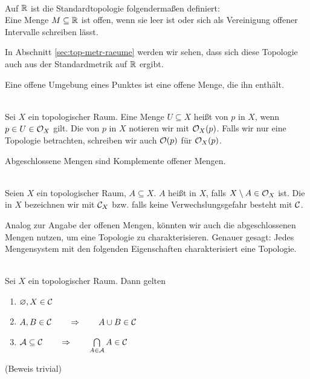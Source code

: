     \begin{bsp}\label{bsp:standard-r}\ \\
        Auf $\mathbb{R}$ ist die Standardtopologie folgendermaßen definiert:\\
        Eine Menge $M \subseteq \mathbb{R}$ ist offen, wenn sie leer ist oder sich als Vereinigung offener Intervalle schreiben lässt.
    \end{bsp}
    In Abschnitt \ref{sec:top-metr-raeume} werden wir sehen, dass sich diese Topologie auch aus der Standardmetrik auf $\mathbb{R}$ ergibt.

    Eine
    offene Umgebung eines Punktes ist eine offene Menge, die ihn enthält.
    \begin{dfn}\label{def:umg} \ \\
        Sei $X$ ein topologischer Raum. Eine Menge $U \subseteq X$ heißt  von $p$ in $X$, wenn $p \in U \in \mathcal{O}_X$ gilt. Die  von $p$ in $X$ notieren wir mit $\mathcal{O}_X(p)$. Falls wir nur eine Topologie betrachten, schreiben wir auch $\mathcal{O}(p)$ für $\mathcal{O}_X(p)$.
    \end{dfn}

    Abgeschlossene
    Mengen sind Komplemente offener Mengen.
    \begin{dfn} \label{def:CX} \ \\
        Seien $X$ ein topologischer Raum, $A \subseteq X$.
        $A$ heißt  in $X$, falls $X \setminus A \in \mathcal{O}_X$ ist.
        Die  in $X$ bezeichnen wir mit $\mathcal{C}_X$ bzw. falls keine Verwechslungsgefahr besteht mit $\mathcal{C}$.
    \end{dfn}
    Analog zur Angabe der offenen Mengen, könnten wir auch die abgeschlossenen Mengen nutzen, um eine Topologie zu charakterisieren. Genauer gesagt: Jedes Mengensystem mit den folgenden Eigenschaften charakterisiert eine Topologie.

    \begin{satz}\label{satz:CX}\ \\
        Sei $X$ ein topologischer Raum. Dann gelten
        \begin{enumerate}
            \item $\varnothing, X \in \mathcal{C}$ 
            \item $A,B \in \mathcal{C} \quad \quad \Rightarrow \quad \quad  A \cup B \in \mathcal{C}$ 
            \item $\mathcal{A} \subseteq \mathcal{C} \quad \quad \Rightarrow \quad \quad \bigcap\limits_{A \in \mathcal{A}} A \in \mathcal{C}$ 
        \end{enumerate}
        (Beweis trivial)
    \end{satz}
    
